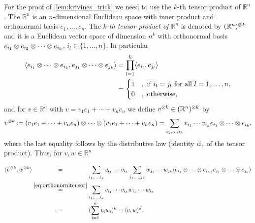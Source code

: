 	\noindent For the proof of \ref{lem:krivines_trick} we need to use the $k$-th tensor product of $\mathbb{R}^n$. The $\mathbb{R}^n$ is an $n$-dimensional Euclidean space with inner product \sclr{\cdot}{\cdot} and orthonormal basis $e_1,\dots,e_n$. The \emph{$k$-th tensor product of $\mathbb{R}^n$} is denoted by $(\mathbb{R}^n)^{\otimes k}$ and it is a Euclidean  vector space of dimension $n^k$ with orthonormal basis $e_{i_1}\otimes e_{i_2} \otimes \cdots \otimes e_{i_k}$, $i_l\in\{1,\dots,n\}$. In particular
	\begin{align}
		\langle{e_{i_1}\ensuremath{\otimes}\cdots \ensuremath{\otimes}e_{i_k}},{e_{j_1}\otimes \cdots \otimes e_{j_k}}\rangle
		&= \prod_{l=1}^k \langle{e_{i_l}},{e_{j_l}}\rangle\nonumber\\
		&=\begin{cases}
			1 & , \text{ if } i_l=j_l \text{ for all } l=1,\dots,n,\\
			0 & , \text{ otherwise},
		\end{cases} \label{eq:orthonormtensor}
	\end{align}
	and for $v\in\mathbb{R}^n$ with $v=v_1e_1+\cdots +v_ne_n$ we define $v^{\otimes k} \in (\mathbb{R}^n)^{\otimes k}$ by 
	\begin{equation}
		v^{\otimes k} \coloneqq (v_1e_1 + \cdots + v_ne_n) \otimes \cdots \otimes (v_1e_1 + \cdots + v_ne_n) = \sum_{i_1,\dots,i_k} v_{i_1}\cdots v_{i_k} e_{i_1}\otimes\cdots\otimes e_{i_k},
	\end{equation}
	where the last equality follows by the distributive law (identity $ii,$ of the tensor product). 
	Thus, for $v,w\in\mathbb{R}^n$ 
	\begin{align}
		\sclr{v^{\tensor k}}{w^{\tensor k}}
		&\overset{\textcolor{white}{\eqref*{eq:orthonormtensor}}}{=} \sum_{i_1,\dots,i_k} v_{i_1}\cdots v_{i_k} \sum_{j_1,\dots,j_k} w_{j_1}\cdots w_{j_k} \sclr{e_{i_1}\tensor\cdots\tensor e_{i_k}}{e_{j_1}\tensor\cdots\tensor e_{j_k}} \nonumber\\
		&\overset{\eqref{eq:orthonormtensor}}{=} \sum_{i_1,\dots,i_k} v_{i_1}\cdots v_{i_k}w_{i_1}\cdots w_{i_k} \nonumber\\
		&\overset{\textcolor{white}{\eqref*{eq:orthonormtensor}}}{=}(\sum_{i=1}^n v_iw_i)^k = \sclr{v}{w}^k. \label{eq:kth_tensor}
	\end{align}
